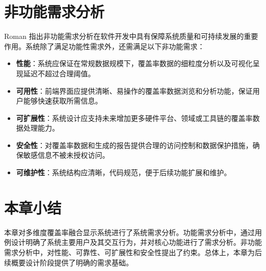 \section{非功能需求分析}
    Roman\cite{Roman1985ATO} 指出非功能需求分析在软件开发中具有保障系统质量和可持续发展的重要作用。系统除了满足功能性需求外，还需满足以下非功能需求：
    \begin{itemize}
        \item \textbf{性能}：系统应保证在常规数据规模下，覆盖率数据的细粒度分析以及可视化呈现延迟不超过合理阈值。
        \item \textbf{可用性}：前端界面应提供清晰、易操作的覆盖率数据浏览和分析功能，保证用户能够快速获取所需信息。
        \item \textbf{可扩展性}：系统设计应支持未来增加更多硬件平台、领域或工具链的覆盖率数据处理能力。
        \item \textbf{安全性}：对覆盖率数据和生成的报告提供合理的访问控制和数据保护措施，确保敏感信息不被未授权访问。
        \item \textbf{可维护性}：系统结构应清晰，代码规范，便于后续功能扩展和维护。
    \end{itemize}

\section{本章小结}
    本章对多维度覆盖率融合显示系统进行了系统需求分析。功能需求分析中，通过用例设计明确了系统主要用户及其交互行为，并对核心功能进行了需求分析。非功能需求分析中，对性能、可靠性、可扩展性和安全性提出了约束。总体上，本章为后续概要设计阶段提供了明确的需求基础。
